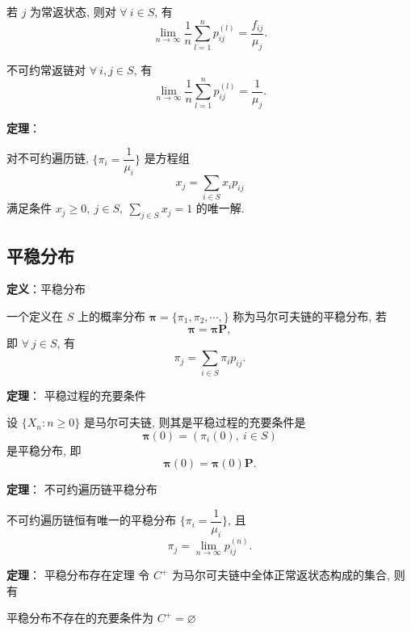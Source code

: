 \documentclass[openany]{ctexbook}
\theoremstyle{kaiti}
\theoremstyle{normal}
\begin{document}
若 $j$ 为常返状态, 则对 $\forall~i\in S$, 有
\begin{equation}
  \lim_{n\to\infty}\frac{1}{n}\sum_{l=1}^np_{ij}^{(l)}=\frac{f_{ij}}{\mu_j}.
\end{equation}

不可约常返链对 $\forall~i,j\in S$, 有
\begin{equation}
  \lim_{n\to\infty}\frac{1}{n}\sum_{l=1}^np_{ij}^{(l)}=\frac{1}{\mu_j}.
\end{equation}

\textbf{定理}：

对不可约遍历链, $\Big\{\pi_i=\dfrac{1}{\mu_i}\Big\}$ 是方程组
\begin{equation}
  x_j=\sum_{i\in S}x_ip_{ij}
\end{equation}
满足条件 $x_j\geqslant0,~j\in S,~\sum_{j\in S}x_j=1$ 的唯一解.

\subsection{平稳分布}

\textbf{定义}：平稳分布

一个定义在 $S$ 上的概率分布 $\bm{\pi}=\{\pi_1,\pi_2,\cdots,\}$ 称为马尔可夫链的平稳分布, 若
\begin{equation}
  \bm{\pi}=\bm{\pi}\bm{P},
\end{equation}
即 $\forall~j\in S$, 有
\begin{equation}
  \pi_j=\sum_{i\in S}\pi_ip_{ij}.
\end{equation}

\textbf{定理}： 平稳过程的充要条件

设 $\{X_n:n\geqslant0\}$ 是马尔可夫链, 则其是平稳过程的充要条件是
\begin{equation}
  \bm{\pi}(0)=(\pi_i(0),~i\in S)
\end{equation}
是平稳分布, 即
\begin{equation}
  \bm{\pi}(0)=\bm{\pi}(0)\bm{P}.
\end{equation}

\textbf{定理}： 不可约遍历链平稳分布

不可约遍历链恒有唯一的平稳分布 $\Big\{\pi_i=\dfrac{1}{\mu_i}\Big\}$, 且
\begin{equation}
  \pi_j=\lim_{n\to\infty}p_{ij}^{(n)}.
\end{equation}

\textbf{定理}： 平稳分布存在定理
令 $C^+$ 为马尔可夫链中全体正常返状态构成的集合, 则有

平稳分布不存在的充要条件为 $C^+=\varnothing$
\end{document}

